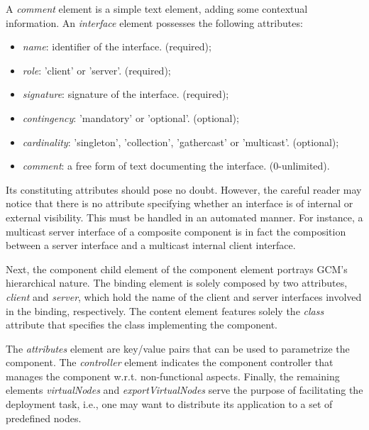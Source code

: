 	\noindent A \textit{comment} element is a simple text element, adding some contextual
	information.	 An \textit{interface} element possesses the following attributes:
	
	
		\begin{itemize}
			\item \textit{name}: identifier of the interface. (required);
			
			\item \textit{role}: 'client' or 'server'. (required);
			
			\item \textit{signature}: signature of the interface. (required);
			
			\item \textit{contingency}: 'mandatory' or 'optional'. (optional);
			
			\item \textit{cardinality}: 'singleton', 'collection', 'gathercast' or 'multicast'. (optional);
						
			\item \textit{comment}: a free form of text documenting the interface. (0-unlimited).
		\end{itemize}	
	
		\noindent Its constituting attributes should pose no doubt. However, the 
		careful reader may notice that there is no attribute specifying whether an interface is
		of internal or external visibility. This must be handled in an automated manner. For instance,
		a multicast server interface of a composite component is in fact the composition
		between a server interface and a multicast internal client interface.	
	
		Next, the component child element of the component element portrays 		
	   \ac{GCM}'s hierarchical nature.	 The binding element is solely composed by two attributes,
	   \textit{client} and \textit{server}, which hold the name of the client and server interfaces involved
	   in the binding, respectively. The content element features solely the \textit{class} attribute that specifies
	   the class implementing the component. 
	   
	   	The \textit{attributes} element  are key/value pairs that can be used to parametrize the component.
		The \textit{controller} element indicates the component controller that manages the component
		w.r.t. non-functional aspects. 	Finally, the remaining elements \textit{virtualNodes} and \textit{exportVirtualNodes}
		serve the purpose of facilitating the deployment task, i.e., one may want to distribute its application
		to a set of predefined nodes.   


